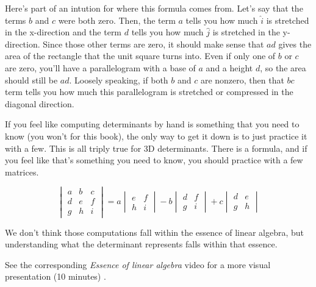 Here's part of an intution for where this formula comes from. Let's say that the
terms $b$ and $c$ were both zero. Then, the term $a$ tells you how much
$\hat{i}$ is stretched in the x-direction and the term $d$ tells you how much
$\hat{j}$ is stretched in the y-direction. Since those other terms are zero, it
should make sense that $ad$ gives the area of the rectangle that the unit square
turns into. Even if only one of $b$ or $c$ are zero, you'll have a parallelogram
with a base of $a$ and a height $d$, so the area should still be $ad$. Loosely
speaking, if both $b$ and $c$ are nonzero, then that $bc$ term tells you how
much this parallelogram is stretched or compressed in the diagonal direction.

If you feel like computing determinants by hand is something that you need to
know (you won't for this book), the only way to get it down is to just practice
it with a few. This is all triply true for 3D determinants. There is a formula,
and if you feel like that's something you need to know, you should practice with
a few matrices.

\begin{equation*}
  \begin{vmatrix}
    a & b & c \\
    d & e & f \\
    g & h & i
  \end{vmatrix} =
  a \begin{vmatrix}
    e & f \\
    h & i
  \end{vmatrix}
  - b \begin{vmatrix}
    d & f \\
    g & i
  \end{vmatrix}
  + c \begin{vmatrix}
    d & e \\
    g & h
  \end{vmatrix}
\end{equation*}

We don't think those computations fall within the essence of linear algebra, but
understanding what the determinant represents falls within that essence.

\begin{remark}
  See the corresponding \textit{Essence of linear algebra} video for a more
  visual presentation (10 minutes) \cite{bib:linalg_the_determinant}.
\end{remark}
